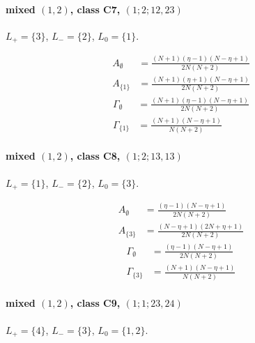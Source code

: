 \documentclass[11pt]{article}
\begin{document}
\paragraph{mixed $(1,2)$, class C7, $(1;2;12,23)$}

$L_+=\{3\}$, $L_-=\{2\}$, $L_0=\{1\}$.

\begin{align*}
  A_{\emptyset} &= \frac{\left(N + 1\right) \left(\eta - 1\right) \left(N - \eta + 1\right)}{2 N \left(N + 2\right)} \\
  A_{\{1\}} &= \frac{\left(N + 1\right) \left(\eta + 1\right) \left(N - \eta + 1\right)}{2 N \left(N + 2\right)} 
\end{align*}
\begin{align*}
  \Gamma_{\emptyset} &= \frac{\left(N + 1\right) \left(\eta - 1\right) \left(N - \eta + 1\right)}{2 N \left(N + 2\right)} \\
  \Gamma_{\{1\}} &= \frac{\left(N + 1\right) \left(N - \eta + 1\right)}{N \left(N + 2\right)} 
\end{align*}

\paragraph{mixed $(1,2)$, class C8, $(1;2;13,13)$}

$L_+=\{1\}$, $L_-=\{2\}$, $L_0=\{3\}$.

\begin{align*}
  A_{\emptyset} &= \frac{\left(\eta - 1\right) \left(N - \eta + 1\right)}{2 N \left(N + 2\right)} \\
  A_{\{3\}} &= \frac{\left(N - \eta + 1\right) \left(2 N + \eta + 1\right)}{2 N \left(N + 2\right)} 
\end{align*}
\begin{align*}
  \Gamma_{\emptyset} &= \frac{\left(\eta - 1\right) \left(N - \eta + 1\right)}{2 N \left(N + 2\right)} \\
  \Gamma_{\{3\}} &= \frac{\left(N + 1\right) \left(N - \eta + 1\right)}{N \left(N + 2\right)} 
\end{align*}

\paragraph{mixed $(1,2)$, class C9, $(1;1;23,24)$}

$L_+=\{4\}$, $L_-=\{3\}$, $L_0=\{1,2\}$.
\end{document}
